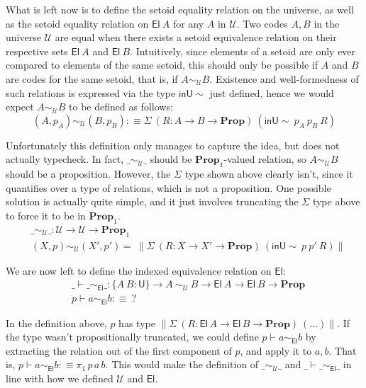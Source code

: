 \documentclass[a4paper,UKenglish,cleveref, autoref, thm-restate]{lipics-v2019}
\newcommand{\setoidU}{\mathcal{U}}
\newcommand{\inUU}{\mathsf{inU{\sim}}}
\newcommand{\mProp}{\mathbf{Prop}}
\newcommand{\U}{\textsf{U}}
\newcommand{\El}{\textsf{El}}
\begin{document}
What is left now is to define the setoid equality relation on the universe, as
well as the setoid equality relation on $\El\ A$ for any $A$ in $\setoidU$.
%
Two codes $A, B$ in the universe $\setoidU$ are equal when there exists a setoid
equivalence relation on their respective sets $\El\ A$ and $\El\ B$. Intuitively,
since elements of a setoid are only ever compared to elements of the same
setoid, this should only be possible if $A$ and $B$ are codes for the same setoid,
that is, if $A \sim_{\setoidU} B$. Existence and well-formedness of such
relations is expressed via the type $\inUU$ just defined, hence we would
expect $A \sim_{\setoidU} B$ to be defined as follows:
\[
(A, p_A) \sim_{\setoidU} (B, p_B) :\equiv \Sigma\ (R: A \to B \to \mProp)\ (\inUU\ p_A\ p_B\ R)
\]

Unfortunately this definition only manages to capture the idea, but does not
actually typecheck. In fact, $\_\sim_{\setoidU}\_$ should be $\mProp_1$-valued
relation, so $A \sim_{\setoidU} B$ should be a proposition. However, the
$\Sigma$ type shown above clearly isn't, since it quantifies over a type of
relations, which is not a proposition.
%
One possible solution is actually quite simple, and it just involves truncating
the $\Sigma$ type above to force it to be in $\mProp_1$.
%
\begin{align*}
  & \_\sim_{\setoidU}\_ : \setoidU \to \setoidU \to \mProp_1 \\
  & (X , p) \sim_{\setoidU} (X' , p') =
   \ \parallel \Sigma\ (R : X \to X' \to \mProp)\ (\inUU\ p\ p'\ R) \parallel
\end{align*}

We are now left to define the indexed equivalence relation on $\El$:
%
\begin{align*}
  & \_\vdash\_\sim_{\El}\_ : \{A\ B : \U\} \to A\ \sim_{\setoidU}\ B \to \El\ A \to \El\ B \to \mProp \\
  & p \vdash a \sim_{\El} b :\equiv \ ?
\end{align*}

In the definition above, $p$ has type $\parallel \Sigma\ (R: \El\,A \to \El\,B \to
\mProp)\ (...) \parallel$. If the type wasn't propositionally truncated, we could define
$p \vdash a \sim_{\El} b$ by extracting the relation out of the first component
of $p$, and apply it to $a, b$. That is, $p \vdash a \sim_{\El} b :\equiv
\pi_1\,p\,a\,b$. This would make the definition of $\_\sim_\setoidU\_$ and
$\_\vdash\_\sim_{\El}\_$ in line with how we defined $\setoidU$ and $\El$.
\end{document}
